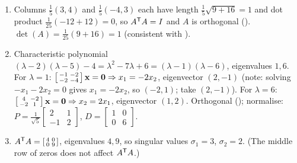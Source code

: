 \begin{enumerate}[label=\textbf{7.\arabic*},leftmargin=2.6em,itemsep=8pt]

\item Columns $\tfrac15(3,4)$ and $\tfrac15(-4,3)$ each have length $\tfrac15\sqrt{9+16}=1$ and dot product $\tfrac1{25}(-12+12)=0$, so $A^{\mathsf{T}} A=I$ and $A$ is orthogonal (). $\det(A)=\tfrac1{25}(9+16)=1$ (consistent with ).

\item Characteristic polynomial $(\lambda-2)(\lambda-5)-4=\lambda^2-7\lambda+6=(\lambda-1)(\lambda-6)$, eigenvalues $1,6$. For $\lambda=1$: $\left[\begin{smallmatrix}-1&-2\\-2&-4\end{smallmatrix}\right]\mathbf{x}=\mathbf{0}\Rightarrow x_1=-2x_2$, eigenvector $(2,-1)$ (note: solving $-x_1-2x_2=0$ gives $x_1=-2x_2$, so $(-2,1)$; take $(2,-1)$). For $\lambda=6$: $\left[\begin{smallmatrix}4&-2\\-2&1\end{smallmatrix}\right]\mathbf{x}=\mathbf{0}\Rightarrow x_2=2x_1$, eigenvector $(1,2)$. Orthogonal (); normalise: $P=\tfrac1{\sqrt5}\left[\begin{smallmatrix}2&1\\-1&2\end{smallmatrix}\right]$, $D=\left[\begin{smallmatrix}1&0\\0&6\end{smallmatrix}\right]$.

\item $A^{\mathsf{T}} A=\left[\begin{smallmatrix}4&0\\0&9\end{smallmatrix}\right]$, eigenvalues $4,9$, so singular values $\sigma_1=3$, $\sigma_2=2$. (The middle row of zeros does not affect $A^{\mathsf{T}} A$.)


\end{enumerate}
